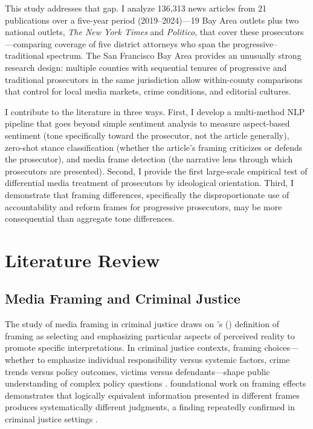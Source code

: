 \documentclass[12pt, letterpaper]{article}
\begin{document}
This study addresses that gap. I analyze 136,313 news articles from 21 publications over a five-year period (2019--2024)---19 Bay Area outlets plus two national outlets, \emph{The New York Times} and \emph{Politico}, that cover these prosecutors---comparing coverage of five district attorneys who span the progressive--traditional spectrum. The San Francisco Bay Area provides an unusually strong research design: multiple counties with sequential tenures of progressive and traditional prosecutors in the same jurisdiction allow within-county comparisons that control for local media markets, crime conditions, and editorial cultures.

I contribute to the literature in three ways. First, I develop a multi-method NLP pipeline that goes beyond simple sentiment analysis to measure aspect-based sentiment (tone specifically toward the prosecutor, not the article generally), zero-shot stance classification (whether the article's framing criticizes or defends the prosecutor), and media frame detection (the narrative lens through which prosecutors are presented). Second, I provide the first large-scale empirical test of differential media treatment of prosecutors by ideological orientation. Third, I demonstrate that framing differences, specifically the disproportionate use of accountability and reform frames for progressive prosecutors, may be more consequential than aggregate tone differences.


\section{Literature Review}

\subsection{Media Framing and Criminal Justice}

The study of media framing in criminal justice draws on \citeauthor{entman1993}'s (\citeyear{entman1993}) definition of framing as selecting and emphasizing particular aspects of perceived reality to promote specific interpretations. In criminal justice contexts, framing choices---whether to emphasize individual responsibility versus systemic factors, crime trends versus policy outcomes, victims versus defendants---shape public understanding of complex policy questions \citep{iyengar1991,gross2008}. \citet{tversky1981} foundational work on framing effects demonstrates that logically equivalent information presented in different frames produces systematically different judgments, a finding repeatedly confirmed in criminal justice settings \citep{slovic2000}.
\end{document}
